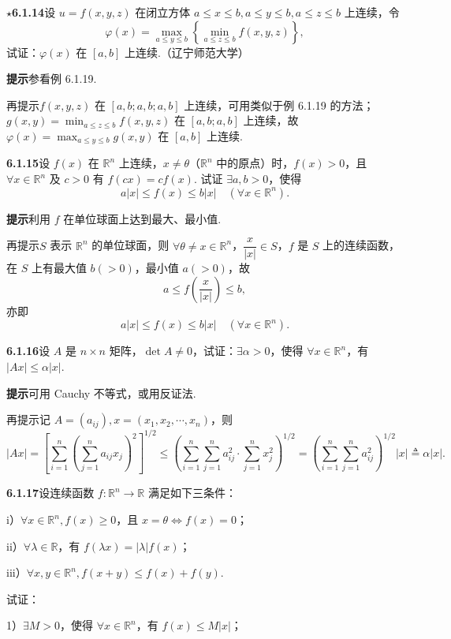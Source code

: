 \documentclass[UTF8,12pt,a4paper,fontset=fandol]{ctexart}
\begin{document}
\noindent\textbf{$\star$6.1.14}\quad 设 $u=f(x,y,z)$ 在闭立方体 $a\le x\le b,a\le y\le b,a\le z\le b$ 上连续，令
\[
  \varphi(x)=\max_{a\le y\le b}\left\{\min_{a\le z\le b}f(x,y,z)\right\},
\]
试证：$\varphi(x)$ 在 $[a,b]$ 上连续.（辽宁师范大学）

\noindent\textbf{提示}\quad 参看例 6.1.19.

再提示\quad $f(x,y,z)$ 在 $[a,b;a,b;a,b]$ 上连续，可用类似于例 6.1.19 的方法；$g(x,y)=\displaystyle\min_{a\le z\le b}f(x,y,z)$ 在 $[a,b;a,b]$ 上连续，故 $\varphi(x)=\displaystyle\max_{a\le y\le b}g(x,y)$ 在 $[a,b]$ 上连续.

\noindent\textbf{6.1.15}\quad 设 $f(x)$ 在 $\mathbb{R}^n$ 上连续，$x\ne\theta$（$\mathbb{R}^n$ 中的原点）时，$f(x)>0$，且 $\forall x\in\mathbb{R}^n$ 及 $c>0$ 有 $f(cx)=cf(x)$. 试证 $\exists a,b>0$，使得
\[
  a|x|\le f(x)\le b|x|\quad(\forall x\in\mathbb{R}^n).
\]

\noindent\textbf{提示}\quad 利用 $f$ 在单位球面上达到最大、最小值.

再提示\quad $S$ 表示 $\mathbb{R}^n$ 的单位球面，则 $\forall\theta\ne x\in\mathbb{R}^n$，$\dfrac{x}{|x|}\in S$，$f$ 是 $S$ 上的连续函数，在 $S$ 上有最大值 $b(>0)$，最小值 $a(>0)$，故
\[
  a\le f\left(\frac{x}{|x|}\right)\le b,
\]
亦即
\[
  a|x|\le f(x)\le b|x|\quad(\forall x\in\mathbb{R}^n).
\]

\noindent\textbf{6.1.16}\quad 设 $A$ 是 $n\times n$ 矩阵，$\det A\ne0$，试证：$\exists\alpha>0$，使得 $\forall x\in\mathbb{R}^n$，有 $|Ax|\le \alpha|x|$.

\noindent\textbf{提示}\quad 可用 Cauchy 不等式，或用反证法.

再提示\quad 记 $A=(a_{ij}),x=(x_1,x_2,\cdots,x_n)$，则
\[
  |Ax|=\left[\sum_{i=1}^n\left(\sum_{j=1}^n a_{ij}x_j\right)^2\right]^{1/2}
  \le \left(\sum_{i=1}^n\sum_{j=1}^n a_{ij}^2\cdot\sum_{j=1}^n x_j^2\right)^{1/2}
  =\left(\sum_{i=1}^n\sum_{j=1}^n a_{ij}^2\right)^{1/2}|x|\triangleq\alpha|x|.
\]

\noindent\textbf{6.1.17}\quad 设连续函数 $f:\mathbb{R}^n\to\mathbb{R}$ 满足如下三条件：

i）$\forall x\in\mathbb{R}^n,f(x)\ge0$，且 $x=\theta\Leftrightarrow f(x)=0$；

ii）$\forall\lambda\in\mathbb{R}$，有 $f(\lambda x)=|\lambda|f(x)$；

iii）$\forall x,y\in\mathbb{R}^n,f(x+y)\le f(x)+f(y)$.

试证：

1）$\exists M>0$，使得 $\forall x\in\mathbb{R}^n$，有 $f(x)\le M|x|$；
\end{document}
